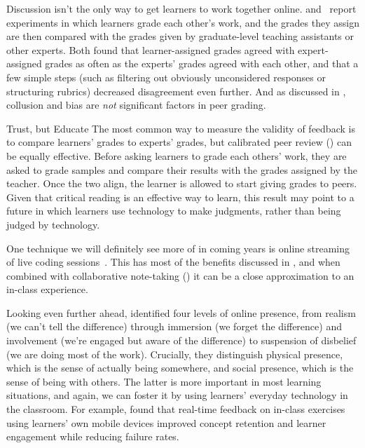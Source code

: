 Discussion isn't the only way to get learners to work together online.
\cite{Pare2008} and~\cite{Kulk2013} report experiments
in which learners grade each other's work,
and the grades they assign are then compared with
the grades given by graduate-level teaching assistants or other experts.
Both found that learner-assigned grades agreed with expert-assigned grades
as often as the experts' grades agreed with each other,
and that a few simple steps
(such as filtering out obviously unconsidered responses or structuring rubrics)
decreased disagreement even further.
And as discussed in ,
collusion and bias are \emph{not} significant factors in peer grading.

\begin{aside}{Trust, but Educate}
  The most common way to measure the validity of feedback
  is to compare learners' grades to experts' grades,
  but calibrated peer review () can be equally effective.
  Before asking learners to grade each others' work,
  they are asked to grade samples and compare their results with the grades assigned by the teacher.
  Once the two align,
  the learner is allowed to start giving grades to peers.
  Given that critical reading is an effective way to learn,
  this result may point to a future in which learners use technology to make judgments,
  rather than being judged by technology.
\end{aside}

One technique we will definitely see more of in coming years is
online streaming of live coding sessions~\cite{Raj2018,Haar2017}.
This has most of the benefits discussed in ,
and when combined with collaborative note-taking ()
it can be a close approximation to an in-class experience.

Looking even further ahead,
\cite{Ijss2000} identified four levels of online presence,
from realism (we can't tell the difference)
through immersion (we forget the difference)
and involvement (we're engaged but aware of the difference)
to suspension of disbelief (we are doing most of the work).
Crucially,
they distinguish physical presence,
which is the sense of actually being somewhere,
and social presence, which is the sense of being with others.
The latter is more important in most learning situations,
and again,
we can foster it by using learners' everyday technology in the classroom.
For example,
\cite{Deb2018} found that real-time feedback on in-class exercises
using learners' own mobile devices
improved concept retention and learner engagement while reducing failure rates.

